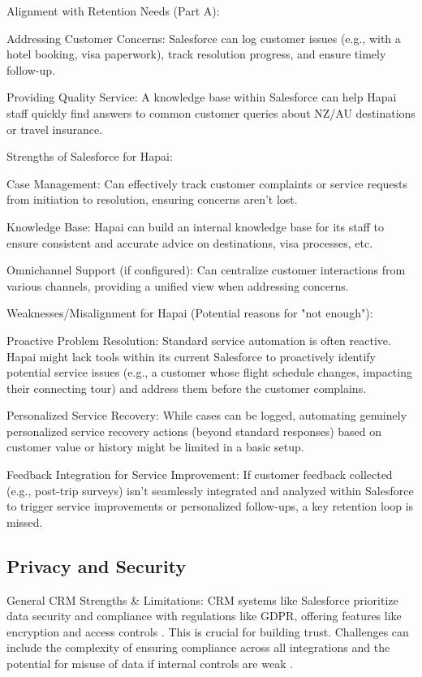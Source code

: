 \documentclass{article}
\begin{document}
Alignment with Retention Needs (Part A):

Addressing Customer Concerns: Salesforce can log customer issues (e.g., with a hotel booking, visa paperwork), track resolution progress, and ensure timely follow-up.

Providing Quality Service: A knowledge base within Salesforce can help Hapai staff quickly find answers to common customer queries about NZ/AU destinations or travel insurance.

Strengths of Salesforce for Hapai:

Case Management: Can effectively track customer complaints or service requests from initiation to resolution, ensuring concerns aren't lost.

Knowledge Base: Hapai can build an internal knowledge base for its staff to ensure consistent and accurate advice on destinations, visa processes, etc.

Omnichannel Support (if configured): Can centralize customer interactions from various channels, providing a unified view when addressing concerns.

Weaknesses/Misalignment for Hapai (Potential reasons for "not enough"):

Proactive Problem Resolution: Standard service automation is often reactive. Hapai might lack tools within its current Salesforce to proactively identify potential service issues (e.g., a customer whose flight schedule changes, impacting their connecting tour) and address them before the customer complains.

Personalized Service Recovery: While cases can be logged, automating genuinely personalized service recovery actions (beyond standard responses) based on customer value or history might be limited in a basic setup.

Feedback Integration for Service Improvement: If customer feedback collected (e.g., post-trip surveys) isn't seamlessly integrated and analyzed within Salesforce to trigger service improvements or personalized follow-ups, a key retention loop is missed.

\subsection{Privacy and Security}

General CRM Strengths \& Limitations:
CRM systems like Salesforce prioritize data security and compliance with regulations like GDPR, offering features like encryption and access controls \cite{jacob_customer_nodate}. This is crucial for building trust. Challenges can include the complexity of ensuring compliance across all integrations and the potential for misuse of data if internal controls are weak \cite{ayub_artificial_2025}.
\end{document}
